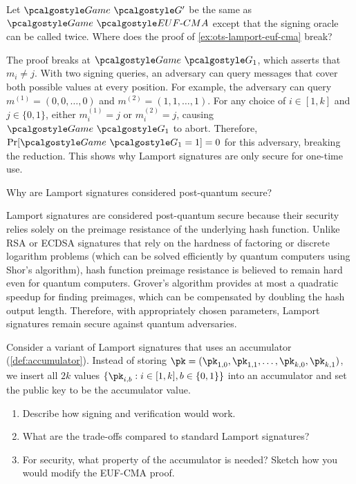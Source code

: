 \begin{exercise}
  Let $\Game~\algo{G'}$ be the same as $\Game~\algo{EUF\text{-}CMA}$ except that the signing oracle can be called twice.
  Where does the proof of \autoref{ex:ots-lamport-euf-cma} break?
\end{exercise}

\ifsolutions
\begin{mysolution}
  The proof breaks at $\Game~\algo{G_1}$, which asserts that $m_i \neq j$.
  With two signing queries, an adversary can query messages that cover both possible values at every position.
  For example, the adversary can query $m^{(1)} = (0, 0, \ldots, 0)$ and $m^{(2)} = (1, 1, \ldots, 1)$.
  For any choice of $i \in [1,k]$ and $j \in \{0,1\}$, either $m^{(1)}_i = j$ or $m^{(2)}_i = j$, causing $\Game~\algo{G_1}$ to abort.
  Therefore, $\Pr[\Game~\algo{G_1} = 1] = 0$ for this adversary, breaking the reduction.
  This shows why Lamport signatures are only secure for one-time use.
\end{mysolution}
\fi

\begin{exercise}[Optional]
  Why are Lamport signatures considered post-quantum secure?
\end{exercise}

\ifsolutions
\begin{mysolution}
  Lamport signatures are considered post-quantum secure because their security relies solely on the preimage resistance of the underlying hash function.
  Unlike RSA or ECDSA signatures that rely on the hardness of factoring or discrete logarithm problems (which can be solved efficiently by quantum computers using Shor's algorithm), hash function preimage resistance is believed to remain hard even for quantum computers.
  Grover's algorithm provides at most a quadratic speedup for finding preimages, which can be compensated by doubling the hash output length.
  Therefore, with appropriately chosen parameters, Lamport signatures remain secure against quantum adversaries.
\end{mysolution}
\fi

\begin{exercise}[Optional]
  Consider a variant of Lamport signatures that uses an accumulator (\autoref{def:accumulator}).
  Instead of storing $\pk = (\pk_{1,0}, \pk_{1,1}, \ldots, \pk_{k,0}, \pk_{k,1})$, we insert all $2k$ values $\{\pk_{i,b} : i \in [1,k], b \in \{0,1\}\}$ into an accumulator and set the public key to be the accumulator value.
  \begin{enumerate}
    \item Describe how signing and verification would work.
    \item What are the trade-offs compared to standard Lamport signatures?
    \item For security, what property of the accumulator is needed?
    Sketch how you would modify the EUF-CMA proof.
  \end{enumerate}
\end{exercise}

